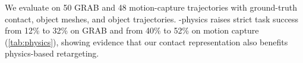 We evaluate on 50 GRAB and 48 motion-capture trajectories with ground-truth contact, object meshes, and object trajectories. \ours-physics raises strict task success from 12\% to 32\% on GRAB and from 40\% to 52\% on motion capture (\cref{tab:physics}), showing evidence that our contact representation also benefits physics-based retargeting.
